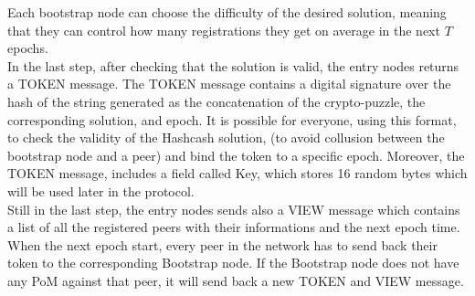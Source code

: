\documentclass[mscthesis]{usiinfthesis}
\begin{document}
Each bootstrap node can choose the difficulty of the desired solution, meaning that they can control how many registrations they get on average in the next $T$ epochs.\\
In the last step, after checking that the solution is valid, the entry nodes returns a TOKEN message. The TOKEN message contains a digital signature over the hash of the string generated as the concatenation of the crypto-puzzle, the corresponding solution, and epoch. It is possible for everyone, using this format, to check the validity of the Hashcash solution, (to avoid collusion between the bootstrap node and a peer) and bind the token to a specific epoch. Moreover, the TOKEN message, includes a field called Key, which stores 16 random bytes which will be used later in the protocol. \\
Still in the last step, the entry nodes sends also a VIEW message which contains a list of all the registered peers with their informations and the next epoch 
time. \\
When the next epoch start, every peer in the network has to send back their token to the corresponding Bootstrap node. If the Bootstrap node does not have any PoM against that peer, it will send back a new TOKEN and VIEW message.
\begin{table}[H]
\centering
{}
\caption{Login message description}
\label{tab:hello-message}
\end{table}

\begin{table}[H]
\centering
{}
\caption{Register message description}
\label{tab:register-message}
\end{table}
\end{document}
